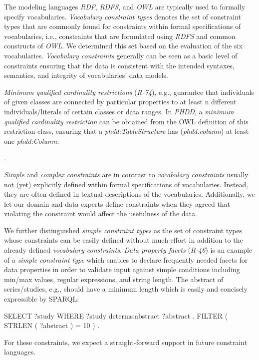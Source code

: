 \documentclass{llncs}
\newcommand{\ms}[1]{\texttt{#1}}
\begin{document}
The modeling languages \emph{RDF}, \emph{RDFS}, and \emph{OWL} are typically used to formally specify vocabularies.
\emph{Vocabulary constraint types}
denotes the set of constraint types that are commonly found for constraints within formal specifications of vocabularies, i.e., constraints that are formulated using \emph{RDFS} and common constructs of \emph{OWL}. We determined this set based on the evaluation of the six vocabularies. \emph{Vocabulary constraints} generally can be seen as a basic level of constraints ensuring that the data is consistent with the intended syntaxes, semantics, and integrity of vocabularies' data models.

\emph{Minimum qualified cardinality restrictions} (\emph{R-74}), e.g., guarantee that individuals of given classes are connected by particular properties to at least n different individuals/literals of certain classes or data ranges.
In \emph{PHDD}, a \emph{minimum qualified cardinality restriction} can be obtained from the OWL definition of this restriction class, ensuring that a \emph{phdd:TableStructure} has (\emph{phdd:column}) at least one \emph{phdd:Column}:
\begin{ex}
 .
\end{ex}

\emph{Simple} and \emph{complex constraints} are in contrast to \emph{vocabulary constraints} usually not (yet) explicitly defined within formal specifications of vocabularies. Instead, they are often defined in textual descriptions of the vocabularies. Additionally, we let our domain and data experts define constraints when they agreed that violating the constraint would affect the usefulness of the data.

We further distinguished \emph{simple constraint types} as the set of constraint types whose constraints can be easily defined without much effort in addition to the already defined \emph{vocabulary constraints}.
\emph{Data property facets} (\emph{R-46}) is an example of a \emph{simple constraint type} which enables to declare frequently needed facets for data properties in order to validate input against simple conditions including min/max values, regular expressions, and string length.
The abstract of series/studies, e.g., should have a minimum length which is easily and concisely expressible by SPARQL: 
\begin{ex}
SELECT ?study WHERE {
    ?study dcterms:abstract ?abstract . FILTER ( STRLEN ( ?abstract ) = 10 ) . }
\end{ex}
For these constraints, we expect a straight-forward support in future constraint languages.
\end{document}
